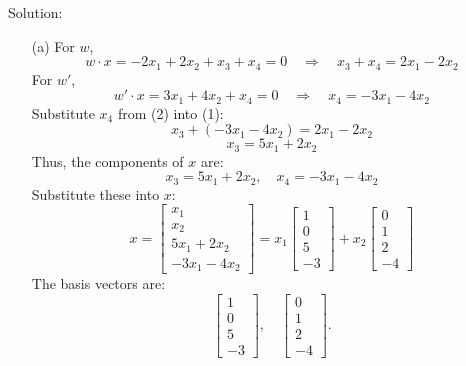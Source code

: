 Solution:
\begin{enumerate}


\item[(a)] For \(w\),
\[
w \cdot x = -2x_1 + 2x_2 + x_3 + x_4 = 0 \quad \Rightarrow \quad x_3 + x_4 = 2x_1 - 2x_2 \tag{1}
\]
For \(w'\),
\[
w' \cdot x = 3x_1 + 4x_2 + x_4 = 0 \quad \Rightarrow \quad x_4 = -3x_1 - 4x_2 \tag{2}
\]
Substitute \(x_4\) from (2) into (1):
\[
x_3 + (-3x_1 - 4x_2) = 2x_1 - 2x_2
\]
\[
x_3 = 5x_1 + 2x_2 \tag{3}
\]
Thus, the components of \(x\) are:
\[
x_3 = 5x_1 + 2x_2, \quad x_4 = -3x_1 - 4x_2
\]
Substitute these into \(x\):
\[
x =
\begin{bmatrix}
x_1 \\
x_2 \\
5x_1 + 2x_2 \\
-3x_1 - 4x_2
\end{bmatrix}
= x_1
\begin{bmatrix}
1 \\
0 \\
5 \\
-3
\end{bmatrix}
+ x_2
\begin{bmatrix}
0 \\
1 \\
2 \\
-4
\end{bmatrix}
\]
The basis vectors are:
\[
\begin{bmatrix}
1 \\
0 \\
5 \\
-3
\end{bmatrix}, \quad
\begin{bmatrix}
0 \\
1 \\
2 \\
-4
\end{bmatrix}.
\]


\end{enumerate}
